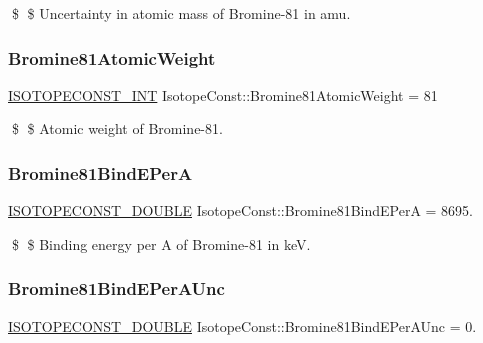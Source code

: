 \$ \$ Uncertainty in atomic mass of Bromine-\/81 in amu. \mbox{\label{group___isotope_const-_bromine-_br81_gad74f1dccd2f7409ff3352c0a79c742cd}} 
\subsubsection{\texorpdfstring{Bromine81\+Atomic\+Weight}{Bromine81AtomicWeight}}
{\footnotesize\ttfamily \mbox{\hyperlink{group___isotope_const-_macros_ga5f18360b3e99483a35c32d789e62621c}{I\+S\+O\+T\+O\+P\+E\+C\+O\+N\+S\+T\+\_\+\+I\+NT}} Isotope\+Const\+::\+Bromine81\+Atomic\+Weight = 81}

\$ \$ Atomic weight of Bromine-\/81. \mbox{\label{group___isotope_const-_bromine-_br81_gad680378e2cd241952e3f59a41a3cdc1e}} 
\subsubsection{\texorpdfstring{Bromine81\+Bind\+E\+PerA}{Bromine81BindEPerA}}
{\footnotesize\ttfamily \mbox{\hyperlink{group___isotope_const-_macros_ga8f45a7272ce02c0b4c65c44636ed719a}{I\+S\+O\+T\+O\+P\+E\+C\+O\+N\+S\+T\+\_\+\+D\+O\+U\+B\+LE}} Isotope\+Const\+::\+Bromine81\+Bind\+E\+PerA = 8695.}

\$ \$ Binding energy per A of Bromine-\/81 in keV. \mbox{\label{group___isotope_const-_bromine-_br81_ga686c6833d37e7c441fa33a6a1ae06f0a}} 
\subsubsection{\texorpdfstring{Bromine81\+Bind\+E\+Per\+A\+Unc}{Bromine81BindEPerAUnc}}
{\footnotesize\ttfamily \mbox{\hyperlink{group___isotope_const-_macros_ga8f45a7272ce02c0b4c65c44636ed719a}{I\+S\+O\+T\+O\+P\+E\+C\+O\+N\+S\+T\+\_\+\+D\+O\+U\+B\+LE}} Isotope\+Const\+::\+Bromine81\+Bind\+E\+Per\+A\+Unc = 0.}

